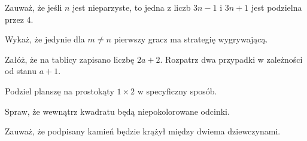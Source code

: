 
\begin{hints_list}
	\item Zauważ, że jeśli $n$ jest nieparzyste, to jedna z liczb $3n - 1$ i $3n + 1$ jest podzielna przez $4$.
	\item Wykaż, że jedynie dla $m \neq n$ pierwszy gracz ma strategię wygrywającą.
	\item Załóż, że na tablicy zapisano liczbę $2a + 2$. Rozpatrz dwa przypadki w zależności od stanu $a + 1$.
	\item Podziel planszę na prostokąty $1\times2$ w specyficzny sposób.
	\item Spraw, że wewnątrz kwadratu będą niepokolorowane odcinki.
	\item Zauważ, że podpisany kamień będzie krążył między dwiema dziewczynami.
\end{hints_list}